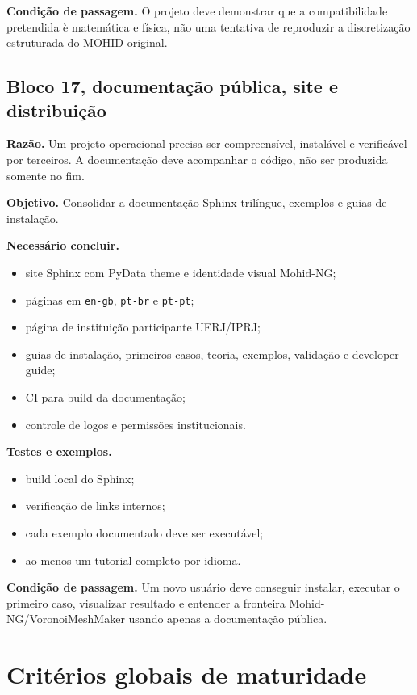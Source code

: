 \documentclass[11pt,a4paper]{article}
\begin{document}
\textbf{Condi\c{c}\~ao de passagem.} O projeto deve demonstrar que a compatibilidade pretendida \`e matem\'atica e f\'isica, n\~ao uma tentativa de reproduzir a discretiza\c{c}\~ao estruturada do MOHID original.

\subsection*{Bloco 17, documenta\c{c}\~ao p\'ublica, site e distribui\c{c}\~ao}

\textbf{Raz\~ao.} Um projeto operacional precisa ser compreens\'ivel, instal\'avel e verific\'avel por terceiros. A documenta\c{c}\~ao deve acompanhar o c\'odigo, n\~ao ser produzida somente no fim.

\textbf{Objetivo.} Consolidar a documenta\c{c}\~ao Sphinx tril\'ingue, exemplos e guias de instala\c{c}\~ao.

\textbf{Necess\'ario concluir.}
\begin{itemize}
  \item site Sphinx com PyData theme e identidade visual Mohid-NG;
  \item p\'aginas em \texttt{en-gb}, \texttt{pt-br} e \texttt{pt-pt};
  \item p\'agina de institui\c{c}\~ao participante UERJ/IPRJ;
  \item guias de instala\c{c}\~ao, primeiros casos, teoria, exemplos, valida\c{c}\~ao e developer guide;
  \item CI para build da documenta\c{c}\~ao;
  \item controle de logos e permiss\~oes institucionais.
\end{itemize}

\textbf{Testes e exemplos.}
\begin{itemize}
  \item build local do Sphinx;
  \item verifica\c{c}\~ao de links internos;
  \item cada exemplo documentado deve ser execut\'avel;
  \item ao menos um tutorial completo por idioma.
\end{itemize}

\textbf{Condi\c{c}\~ao de passagem.} Um novo usu\'ario deve conseguir instalar, executar o primeiro caso, visualizar resultado e entender a fronteira Mohid-NG/VoronoiMeshMaker usando apenas a documenta\c{c}\~ao p\'ublica.

\section{Crit\'erios globais de maturidade}
\end{document}
